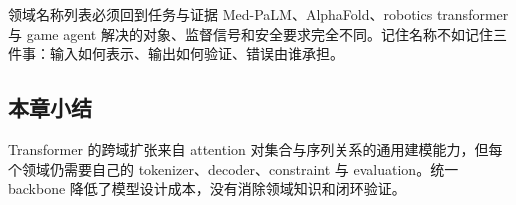 

\begin{warningbox}{领域名称列表必须回到任务与证据}
Med-PaLM、AlphaFold、robotics transformer 与 game agent 解决的对象、监督信号和安全要求完全不同。记住名称不如记住三件事：输入如何表示、输出如何验证、错误由谁承担。
\end{warningbox}

\subsection{本章小结}

Transformer 的跨域扩张来自 attention 对集合与序列关系的通用建模能力，但每个领域仍需要自己的 tokenizer、decoder、constraint 与 evaluation。统一 backbone 降低了模型设计成本，没有消除领域知识和闭环验证。

